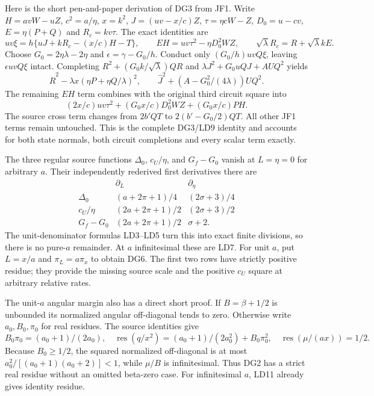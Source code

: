 Here is the short pen-and-paper derivation of DG3 from JF1.
Write $H=avW-uZ$, $c^2=a/\eta$, $x=k^2$,
$J=(uv-x/c)Z$, $\tau=\eta cW-Z$, $D_0=u-cv$,
$E=\eta(P+Q)$ and $R_c=kv\tau$.  The exact identities are
\[
 uv\xi=h\{uJ+kR_c-(x/c)H-T\},\qquad
 EH=uv\tau^2-\eta D_0^2WZ,
 \qquad \sqrt\lambda R_c=R+\sqrt\lambda kE.
\]
Choose $G_0=2\eta\lambda-2\eta$ and
$\epsilon=\gamma-G_0/h$.  Conduct only
$(G_0/h)uvQ\xi$, leaving $\epsilon uvQ\xi$ intact.  Completing
$R^2+(G_0k/\sqrt\lambda)QR$ and
$\lambda J^2+G_0uQJ+AUQ^2$ yields
\[
 \widehat R^2-\lambda x(\eta P+\eta Q/\lambda)^2,
 \qquad \widehat J^2+
          \left(A-G_0^2/(4\lambda)\right)UQ^2.
\]
The remaining $EH$ term combines with the original third circuit
square into
\[
        (2x/c)uv\tau^2+(G_0x/c)D_0^2WZ+(G_0x/c)PH.
\]
The source cross term changes from $2b'QT$ to
$2(b'-G_0/2)QT$.  All other JF1 terms remain untouched.
This is the complete DG3/LD9 identity and accounts for both state
normals, both circuit completions and every scalar term exactly.

The three regular source functions
$\Delta_0$, $c_U/\eta$, and $G_f-G_0$ vanish at $L=\eta=0$
for arbitrary $a$.  Their independently rederived first derivatives
there are
\[
\begin{array}{c|cc}
 &\partial_L&\partial_\eta\\\hline
 \Delta_0&(a+2\pi+1)/4&(2\sigma+3)/4\\
 c_U/\eta&(2a+2\pi+1)/2&(2\sigma+3)/2\\
 G_f-G_0&(2a+2\pi+1)/2&\sigma+2.
\end{array}
\]
The unit-denominator formulas LD3--LD5 turn this into exact finite
divisions, so there is no pure-$a$ remainder.  At $a$ infinitesimal
these are LD7.  For unit $a$, put $L=x/a$ and
$\pi_{L}=a\pi_x$ to obtain DG6.  The first two rows have strictly
positive residue; they provide the missing source scale and the
positive $c_U$ square at arbitrary relative rates.

The unit-$a$ angular margin also has a direct short proof.  If
$B=\beta+1/2$ is unbounded its normalized angular off-diagonal
tends to zero.  Otherwise write $a_0,B_0,\pi_0$ for real residues.
The source identities give
\[
 B_0\pi_0=(a_0+1)/(2a_0),\quad
 \operatorname{res}(q/x^2)=(a_0+1)/(2a_0^2)+B_0\pi_0^2,
 \quad \operatorname{res}(\mu/(a x))=1/2.
\]
Because $B_0\ge1/2$, the squared normalized off-diagonal is at
most $a_0^2/[(a_0+1)(a_0+2)]<1$, while $\mu/B$ is infinitesimal.
Thus DG2 has a strict real residue without an omitted beta-zero
case.  For infinitesimal $a$, LD11 already gives identity residue.

